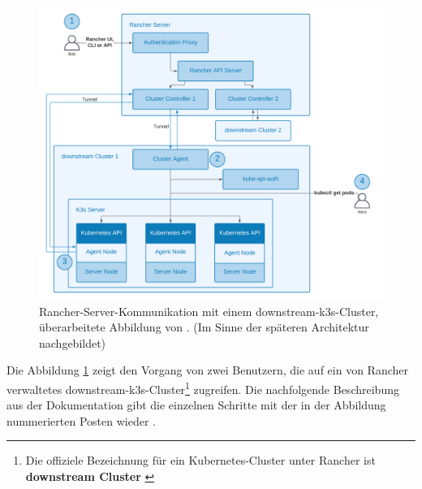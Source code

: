 \begin{figure}[!htb]
  \centering
  \includegraphics[width=0.8\columnwidth]{images/RancherArchitekturClusterController.png}
  \caption{Rancher-Server-Kommunikation mit einem downstream-k3s-Cluster, überarbeitete Abbildung von \cite{rancherArchitecture}. (Im Sinne der späteren Architektur nachgebildet)}
  \label{fig:rancherarchitektur}
\end{figure}

Die Abbildung \ref{fig:rancherarchitektur} zeigt den Vorgang von zwei Benutzern, 
die auf ein von Rancher verwaltetes downstream-k3s-Cluster\footnote{Die offiziele Bezeichnung für ein Kubernetes-Cluster unter Rancher ist \textbf{downstream Cluster} \cite{rancherArchitectureRecommendations}} zugreifen.
Die nachfolgende Beschreibung aus der Dokumentation gibt die einzelnen Schritte mit der in der Abbildung nummerierten Posten wieder \cite{rancherArchitecture}.


